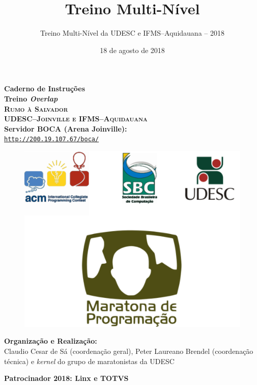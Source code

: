 \documentclass[12pt,oneside]{article}
\author{Treino Multi-Nível da UDESC e IFMS--Aquidauana -- 2018}
\title{Treino Multi-Nível}
\date{18 de agosto de 2018}
\begin{document}
\begin{center}
\textbf{\Huge Caderno de Instruções \\ Treino \textit{Overlap}} \\
\vspace{0.2cm}
\textbf{\textsc{\large  Rumo à Salvador}} \\
\vspace{0.5cm}
\textbf{\textsc{\large UDESC--Joinville e IFMS--Aquidauana}} \\
\vspace{0.5cm}
\textbf{Servidor BOCA (Arena Joinville):}\\
\texttt{\large \url{http://200.19.107.67/boca/}} \\
\vspace{1.0cm}
\begin{figure}[h!]
\centering
 \includegraphics[scale=0.5]{figuras/capa.pdf}
\end{figure}
\vspace{1.0cm}
\textbf{Organização e Realização:}\\
\vspace{0.4cm}
{\small Claudio Cesar de Sá (coordenação geral), Peter Laureano Brendel (coordenação técnica) e  \textit{kernel} do 
grupo de maratonistas da UDESC
}
\end{center}


\begin{center}
\vfill
\textbf{Patrocinador 2018: {\sf Linx  e TOTVS}}
\end{center}
\end{document}
